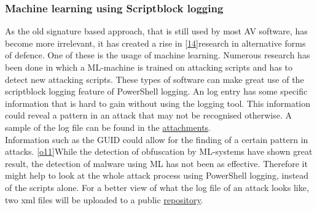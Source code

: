 \documentclass{article}%
\begin{document}
\subsubsection{Machine learning using Scriptblock logging}
As the old signature based approach, that is still used by most AV software, has become more irrelevant, it has created a rise in [\hyperlink{14}{14}]research in alternative forms of defence. One of these is the usage of machine learning. Numerous research has been done in which a ML-machine is trained on attacking scripts and has to detect new attacking scripts. These types of software can make great use of the scriptblock logging feature of PowerShell logging. An log entry has some specific information that is hard to gain without using the logging tool. This information could reveal a pattern in an attack that may not be recognised otherwise. A sample of the log file can be found in the \hyperlink{output2}{attachments}.\\
Information such as the GUID could allow for the finding of a certain pattern in attacks. [\hyperlink{o11}{o11}]While the detection of obfuscation by ML-systems have shown great result, the detection of malware using ML has not been as effective. Therefore it might help to look at the whole attack process using PowerShell logging, instead of the scripts alone. For a better view of what the log file of an attack looks like, two xml files will be uploaded to a public \href{https://github.com/ZamirAmiri/Obfuscation}{repository}.
\end{document}
